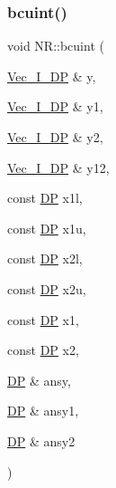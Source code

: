 \subsubsection{\texorpdfstring{bcuint()}{bcuint()}}
{\footnotesize\ttfamily void N\+R\+::bcuint (\begin{DoxyParamCaption}\item[{\mbox{\hyperlink{namespaceNR_a9f943da53862537c552e2a770cb170ae}{Vec\+\_\+\+I\+\_\+\+DP}} \&}]{y,  }\item[{\mbox{\hyperlink{namespaceNR_a9f943da53862537c552e2a770cb170ae}{Vec\+\_\+\+I\+\_\+\+DP}} \&}]{y1,  }\item[{\mbox{\hyperlink{namespaceNR_a9f943da53862537c552e2a770cb170ae}{Vec\+\_\+\+I\+\_\+\+DP}} \&}]{y2,  }\item[{\mbox{\hyperlink{namespaceNR_a9f943da53862537c552e2a770cb170ae}{Vec\+\_\+\+I\+\_\+\+DP}} \&}]{y12,  }\item[{const \mbox{\hyperlink{namespaceNR_af6ff762dd605ff477b8e52387253a02a}{DP}}}]{x1l,  }\item[{const \mbox{\hyperlink{namespaceNR_af6ff762dd605ff477b8e52387253a02a}{DP}}}]{x1u,  }\item[{const \mbox{\hyperlink{namespaceNR_af6ff762dd605ff477b8e52387253a02a}{DP}}}]{x2l,  }\item[{const \mbox{\hyperlink{namespaceNR_af6ff762dd605ff477b8e52387253a02a}{DP}}}]{x2u,  }\item[{const \mbox{\hyperlink{namespaceNR_af6ff762dd605ff477b8e52387253a02a}{DP}}}]{x1,  }\item[{const \mbox{\hyperlink{namespaceNR_af6ff762dd605ff477b8e52387253a02a}{DP}}}]{x2,  }\item[{\mbox{\hyperlink{namespaceNR_af6ff762dd605ff477b8e52387253a02a}{DP}} \&}]{ansy,  }\item[{\mbox{\hyperlink{namespaceNR_af6ff762dd605ff477b8e52387253a02a}{DP}} \&}]{ansy1,  }\item[{\mbox{\hyperlink{namespaceNR_af6ff762dd605ff477b8e52387253a02a}{DP}} \&}]{ansy2 }\end{DoxyParamCaption})}

\mbox{\label{namespaceNR_a59a7410b6bb6b498a11bb530d8bf6f0c}} 
